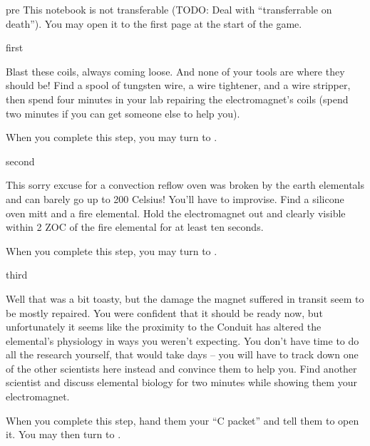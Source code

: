 \documentclass[notebook]{elementals}
\begin{document}

\startnotebook{\nElectromagnet{}}

\begin{page}{pre}
This notebook is not transferable (TODO: Deal with ``transferrable on death''). You may open it to the first page at the start of the game.
\end{page}

\begin{page}{first}

Blast these coils, always coming loose. And none of your tools are where they should be! Find a spool of tungsten wire, a wire tightener, and a wire stripper, then spend four minutes in your lab repairing the electromagnet's coils (spend two minutes if you can get someone else to help you).

When you complete this step, you may turn to .

\end{page}

\begin{page}{second}

This sorry excuse for a convection reflow oven was broken by the earth elementals and can barely go up to 200 Celsius! You'll have to improvise. Find a silicone oven mitt and a fire elemental. Hold the electromagnet out and clearly visible within 2 ZOC of the fire elemental for at least ten seconds.

When you complete this step, you may turn to .

\end{page}

\begin{page}{third}

Well that was a bit toasty, but the damage the magnet suffered in transit seem to be mostly repaired. You were confident that it should be ready now, but unfortunately it seems like the proximity to the Conduit has altered the elemental's physiology in ways you weren't expecting. You don't have time to do all the research yourself, that would take days -- you will have to track down one of the other scientists here instead and convince them to help you. Find another scientist and discuss elemental biology for two minutes while showing them your electromagnet.

When you complete this step, hand them your ``C packet'' and tell them to open it. You may then turn to .

\end{page}
\end{document}
